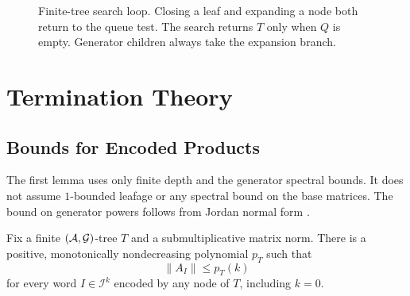 \begin{figure}[ht]
    \centering
    \caption{Finite-tree search loop.
    Closing a leaf and expanding a node both return to the queue test.
    The search returns $T$ only when $Q$ is empty.
    Generator children always take the expansion branch.}
    \label{fig:finiteTreeWorkflow}
\end{figure}

\section{Termination Theory}

\subsection{Bounds for Encoded Products}

The first lemma uses only finite depth and the generator spectral bounds.
It does not assume $1$-bounded leafage or any spectral bound on the base matrices.
The bound on generator powers follows from Jordan normal form \citep{HornJohnson1985MatrixAnalysis}.

\begin{lemma}
    \label{lem:finitePolynomialBound}
    Fix a finite $(\mathcal{A},\mathcal{G})$-tree $T$ and a submultiplicative matrix norm.
    There is a positive, monotonically nondecreasing polynomial $p_T$ such that
    \[
        \lVert A_I\rVert\leq p_T(k)
    \]
    for every word $I\in\mathcal{I}^k$ encoded by any node of $T$, including $k=0$.
\end{lemma}

